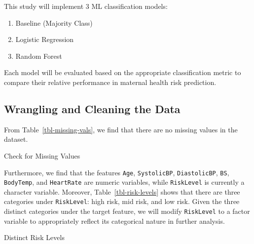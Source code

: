 \documentclass[
  letterpaper,
  DIV=11,
  numbers=noendperiod]{scrartcl}
\providecommand{\tightlist}{%
  \setlength{\itemsep}{0pt}\setlength{\parskip}{0pt}}\usepackage{longtable,booktabs,array}
\begin{document}
This study will implement 3 ML classification models:

\begin{enumerate}
\def\labelenumi{\arabic{enumi}.}
\tightlist
\item
  Baseline (Majority Class)
\item
  Logistic Regression
\item
  Random Forest
\end{enumerate}

Each model will be evaluated based on the appropriate classification
metric to compare their relative performance in maternal health risk
prediction.

\subsection{Wrangling and Cleaning the
Data}\label{wrangling-and-cleaning-the-data}

From Table~\ref{tbl-missing-vals}, we find that there are no missing
values in the dataset.

\begin{table}

\caption{\label{tbl-missing-vals}Check for Missing Values}


\end{table}%

Furthermore, we find that the features \texttt{Age},
\texttt{SystolicBP}, \texttt{DiastolicBP}, \texttt{BS},
\texttt{BodyTemp}, and \texttt{HeartRate} are numeric variables, while
\texttt{RiskLevel} is currently a character variable. Moreover,
Table~\ref{tbl-risk-levels} shows that there are three categories under
\texttt{RiskLevel}: high risk, mid risk, and low risk. Given the three
distinct categories under the target feature, we will modify
\texttt{RiskLevel} to a factor variable to appropriately reflect its
categorical nature in further analysis.

\begin{table}

\caption{\label{tbl-risk-levels}Distinct Risk Levels}


\end{table}%
\end{document}
